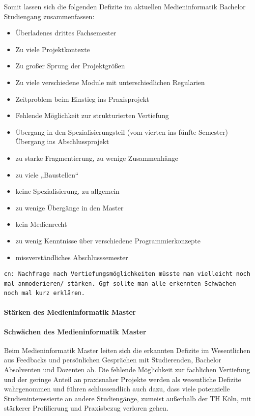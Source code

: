 Somit lassen sich die folgenden Defizite im aktuellen Medieninformatik
Bachelor Studiengang zusammenfassen:

\begin{itemize}
\tightlist
\item
  Überladenes drittes Fachsemester
\item
  Zu viele Projektkontexte
\item
  Zu großer Sprung der Projektgrößen
\item
  Zu viele verschiedene Module mit unterschiedlichen Regularien
\item
  Zeitproblem beim Einstieg ins Praxisprojekt
\item
  Fehlende Möglichkeit zur strukturierten Vertiefung
\item
  Übergang in den Spezialisierungsteil (vom vierten ins fünfte Semester)
  Übergang ins Abschlussprojekt
\item
  zu starke Fragmentierung, zu wenige Zusammenhänge
\item
  zu viele „Baustellen``
\item
  keine Spezialisierung, zu allgemein
\item
  zu wenige Übergänge in den Master
\item
  kein Medienrecht
\item
  zu wenig Kenntnisse über verschiedene Programmierkonzepte
\item
  missverständliches Abschlusssemester
\end{itemize}

\begin{verbatim}
cn: Nachfrage nach Vertiefungsmöglichkeiten müsste man vielleicht noch mal anmoderieren/ stärken. Ggf sollte man alle erkennten Schwächen noch mal kurz erklären.
\end{verbatim}

\paragraph{Stärken des Medieninformatik
Master}\label{stuxe4rken-des-medieninformatik-master}

\paragraph{Schwächen des Medieninformatik
Master}\label{schwuxe4chen-des-medieninformatik-master}

Beim Medieninformatik Master leiten sich die erkannten Defizite im
Wesentlichen aus Feedbacks und persönlichen Gesprächen mit Studierenden,
Bachelor Absolventen und Dozenten ab. Die fehlende Möglichkeit zur
fachlichen Vertiefung und der geringe Anteil an praxisnaher Projekte
werden als wesentliche Defizite wahrgenommen und führen schlussendlich
auch dazu, dass viele potenzielle Studieninteressierte an andere
Studiengänge, zumeist außerhalb der TH Köln, mit stärkerer Profilierung
und Praxisbezug verloren gehen.

